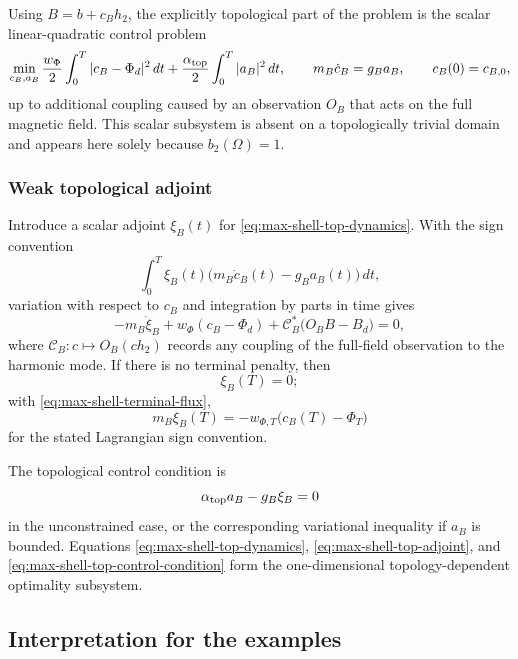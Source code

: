 \documentclass{article}
\begin{document}
Using $B=b+c_Bh_2$, the explicitly topological part of the problem is
the scalar linear-quadratic control problem
\begin{equation}
  \min_{c_B,a_B}
  \frac{w_\Phi}{2}
  \int_0^T|c_B-\Phi_d|^2\,dt
  +
  \frac{\alpha_{\rm top}}{2}
  \int_0^T|a_B|^2\,dt,
  \qquad
  m_B\dot c_B=g_Ba_B,
  \qquad
  c_B(0)=c_{B,0},
\end{equation}
up to additional coupling caused by an observation $O_B$ that acts on
the full magnetic field.  This scalar subsystem is absent on a
topologically trivial domain and appears here solely because
$b_2(\Omega)=1$.

\subsubsection{Weak topological adjoint}

Introduce a scalar adjoint $\xi_B(t)$ for
\eqref{eq:max-shell-top-dynamics}.  With the sign convention
\[
  \int_0^T
  \xi_B(t)
  \bigl(
    m_B\dot c_B(t)-g_Ba_B(t)
  \bigr)\,dt,
\]
variation with respect to $c_B$ and integration by parts in time gives
\begin{equation}
  -m_B\dot\xi_B
  +
  w_\Phi(c_B-\Phi_d)
  +
  \mathcal C_B^\ast
  \bigl(O_BB-B_d\bigr)
  =
  0,
  \label{eq:max-shell-top-adjoint}
\end{equation}
where $\mathcal C_B:c\mapsto O_B(ch_2)$ records any coupling of the
full-field observation to the harmonic mode.  If there is no terminal
penalty, then
\[
  \xi_B(T)=0;
\]
with \eqref{eq:max-shell-terminal-flux},
\[
  m_B\xi_B(T)
  =
  -w_{\Phi,T}\bigl(c_B(T)-\Phi_T\bigr)
\]
for the stated Lagrangian sign convention.

The topological control condition is
\begin{equation}
  \alpha_{\rm top}a_B-g_B\xi_B=0
  \label{eq:max-shell-top-control-condition}
\end{equation}
in the unconstrained case, or the corresponding variational
inequality if $a_B$ is bounded.  Equations
\eqref{eq:max-shell-top-dynamics},
\eqref{eq:max-shell-top-adjoint}, and
\eqref{eq:max-shell-top-control-condition} form the
one-dimensional topology-dependent optimality subsystem.


\subsection{Interpretation for the examples}
\label{sec:maxwell-interpretation}
\end{document}
